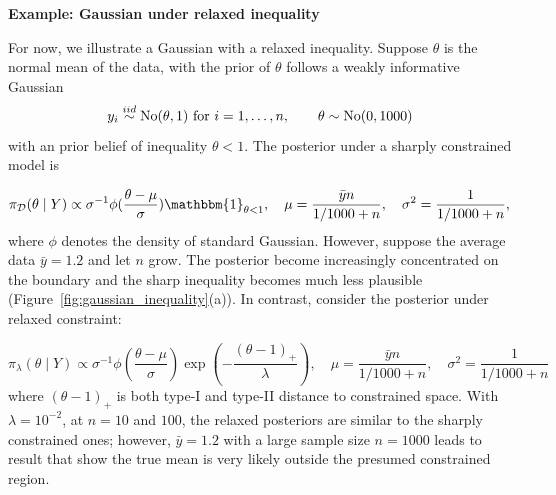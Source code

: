 \documentclass[10pt,fleqn]{article}
\DeclareMathOperator{\1}{\mathbbm{1}} \DeclareMathOperator{\bigO}{\mc O}
\begin{document}
\textbf{Example: Gaussian under relaxed inequality}

For now, we illustrate a Gaussian with a relaxed inequality. Suppose $\theta$ is the normal mean of the data, with the prior of $\theta$ follows a weakly informative Gaussian
 $$y_i \stackrel{iid}{\sim} \operatorname{No}(\theta,1) \text{ for } i =1,\ldots,n, \qquad \theta \sim\operatorname{No}(0, 1000)$$ 
 with an prior belief of inequality $\theta<1$. The posterior under a sharply constrained model is

$$ \pi_{\mc D}(\theta \mid Y) \propto {\sigma^{-1}}\phi(\frac{\theta- \mu}{\sigma}) \mathbbm{1}_{\theta<1}, \quad \mu=    \frac{ \bar yn}{ 1/1000 + n },   \quad \sigma^2 = \frac{1}{ 1/1000 + n },$$
where $\phi$ denotes the density of standard Gaussian. 
However, suppose the average data $\bar y=1.2$ and let $n$ grow. The posterior become increasingly concentrated on the boundary and the sharp inequality becomes much less plausible (Figure~\ref{fig:gaussian_inequality}(a)). In contrast, consider the posterior under relaxed constraint:

$$ \pi_{\lambda}(\theta \mid Y) \propto {\sigma^{-1}}\phi(\frac{\theta- \mu}{\sigma}) \exp(-\frac{(\theta-1)_+ }{\lambda}) , \quad \mu=    \frac{ \bar y n}{ 1/1000 + n },   \quad \sigma^2 = \frac{1}{ 1/1000 + n }$$
where $(\theta-1)_+$ is both type-I and type-II distance to constrained space. With $\lambda=10^{-2}$, at $n=10$ and $100$, the relaxed posteriors are similar to the sharply constrained
ones; however, $\bar y=1.2$ with a large sample size $n=1000$ leads to result that show the true mean is
very likely outside the presumed constrained region.
\end{document}
